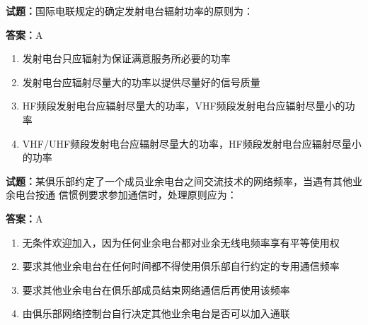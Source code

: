 \documentclass{ctexbook}
\begin{document}




\vspace{1em}

\textbf{试题：}国际电联规定的确定发射电台辐射功率的原则为： 

\textbf{答案：}A 

\begin{enumerate}[leftmargin=3em]
  \item 发射电台只应辐射为保证满意服务所必要的功率 

  \item 发射电台应辐射尽量大的功率以提供尽量好的信号质量 

  \item HF频段发射电台应辐射尽量大的功率，VHF频段发射电台应辐射尽量小的功率 

  \item VHF/UHF频段发射电台应辐射尽量大的功率，HF频段发射电台应辐射尽量小的功率 

\end{enumerate}





\vspace{1em}

\textbf{试题：}某俱乐部约定了一个成员业余电台之间交流技术的网络频率，当遇有其他业余电台按通
信惯例要求参加通信时，处理原则应为： 

\textbf{答案：}A 

\begin{enumerate}[leftmargin=3em]
  \item 无条件欢迎加入，因为任何业余电台都对业余无线电频率享有平等使用权 

  \item 要求其他业余电台在任何时间都不得使用俱乐部自行约定的专用通信频率 

  \item 要求其他业余电台在俱乐部成员结束网络通信后再使用该频率 

  \item 由俱乐部网络控制台自行决定其他业余电台是否可以加入通联 

\end{enumerate}



\end{document}
